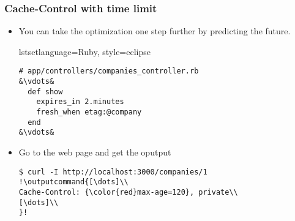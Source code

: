 \documentclass{beamer}
\newcommand{\outputcommand}[1]{\color{darkgreen}{#1}}
\begin{document}
\begin{frame}[fragile]
\frametitle{Cache-Control with time limit}
\begin{itemize}
\item You can take the optimization one step further by predicting the future. 

\lstset{language=Ruby, style=eclipse}
lstset{language=Ruby, style=eclipse}
\begin{lstlisting}[escapechar=&]
# app/controllers/companies_controller.rb
&\vdots&
  def show
    expires_in 2.minutes
    fresh_when etag:@company
  end
&\vdots&
\end{lstlisting}

\item Go to the web page and get the oputput
\lstset{language=shell}
\begin{lstlisting}[escapechar=!]
$ curl -I http://localhost:3000/companies/1
!\outputcommand{[\dots]\\
Cache-Control: {\color{red}max-age=120}, private\\
[\dots]\\
}!
\end{lstlisting}

\end{itemize}

\end{frame}
\end{document}

